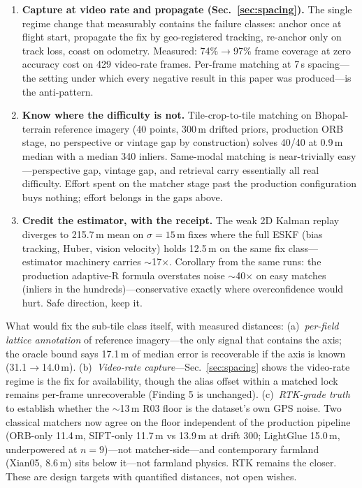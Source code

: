 \documentclass[journal]{IEEEtran}
\begin{document}
\begin{enumerate}
\item \textbf{Capture at video rate and propagate (Sec.~\ref{sec:spacing}).} The single regime change that measurably contains the failure classes: anchor once at flight start, propagate the fix by geo-registered tracking, re-anchor only on track loss, coast on odometry. Measured: 74\%$\to$97\% frame coverage at zero accuracy cost on 429 video-rate frames. Per-frame matching at 7\,s spacing---the setting under which every negative result in this paper was produced---is the anti-pattern.
\item \textbf{Know where the difficulty is not.} Tile-crop-to-tile matching on Bhopal-terrain reference imagery (40 points, 300\,m drifted priors, production ORB stage, no perspective or vintage gap by construction) solves 40/40 at 0.9\,m median with a median 340 inliers. Same-modal matching is near-trivially easy---perspective gap, vintage gap, and retrieval carry essentially all real difficulty. Effort spent on the matcher stage past the production configuration buys nothing; effort belongs in the gaps above.
\item \textbf{Credit the estimator, with the receipt.} The weak 2D Kalman replay diverges to 215.7\,m mean on $\sigma{=}15$\,m fixes where the full ESKF (bias tracking, Huber, vision velocity) holds 12.5\,m on the same fix class---estimator machinery carries $\sim$17$\times$. Corollary from the same runs: the production adaptive-R formula overstates noise $\sim$40$\times$ on easy matches (inliers in the hundreds)---conservative exactly where overconfidence would hurt. Safe direction, keep it.
\end{enumerate}

What would fix the sub-tile class itself, with measured distances: (a)~\emph{per-field lattice annotation} of reference imagery---the only signal that contains the axis; the oracle bound says 17.1\,m of median error is recoverable if the axis is known (31.1$\to$14.0\,m). (b)~\emph{Video-rate capture}---Sec.~\ref{sec:spacing} shows the video-rate regime is the fix for availability, though the alias offset within a matched lock remains per-frame unrecoverable (Finding 5 is unchanged). (c)~\emph{RTK-grade truth} to establish whether the $\sim$13\,m R03 floor is the dataset's own GPS noise. Two classical matchers now agree on the floor independent of the production pipeline (ORB-only 11.4\,m, SIFT-only 11.7\,m vs 13.9\,m at drift 300; LightGlue 15.0\,m, underpowered at $n{=}9$)---not matcher-side---and contemporary farmland (Xian05, 8.6\,m) sits below it---not farmland physics. RTK remains the closer. These are design targets with quantified distances, not open wishes.
\end{document}
